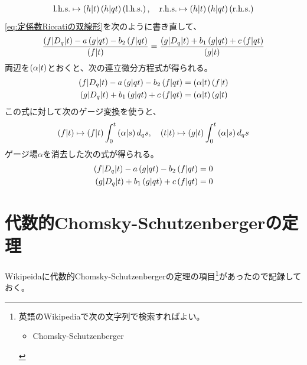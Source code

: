 {\begin{equation*}
\begin{split}
		\text{l.h.s.} \mapsto \plr{h|t}\plr{h|qt}\plr{\text{l.h.s.}}
		,\quad \text{r.h.s.} \mapsto \plr{h|t}\plr{h|qt} \plr{\text{r.h.s.}}
	\end{split}\end{equation*}
	\eqref{eq:定係数Riccatiの双線形}を次のように書き直して、
	\begin{equation*}\begin{split}
		\frac{\plr{f|D_q|t} - a\plr{g|qt} - b_2\plr{f|qt}}{\plr{f|t}}
		= \frac{\plr{g|D_q|t}+ b_1\plr{g|qt} + c\plr{f|qt}} {\plr{g|t}}
	\end{split}\end{equation*}
	両辺を$\plr{\alpha|t}$とおくと、次の連立微分方程式が得られる。
	\begin{equation*}\begin{split}
		\plr{f|D_q|t} - a\plr{g|qt} - b_2\plr{f|qt} 
		&= \plr{\alpha|t}\plr{f|t} \\
		\plr{g|D_q|t} + b_1\plr{g|qt} + c\plr{f|qt} &= \plr{\alpha|t}\plr{g|t}
	\end{split}\end{equation*}
	この式に対して次のゲージ変換を使うと、
	\begin{equation*}\begin{split}
		\plr{f|t}\mapsto \plr{f|t}\int_0^t\plr{\alpha|s}d_qs
		,\quad \plr{t|t}\mapsto \plr{g|t}\int_0^t\plr{\alpha|s}d_qs
	\end{split}\end{equation*}
	ゲージ場$\alpha$を消去した次の式が得られる。
	\begin{equation*}\begin{split}
		\plr{f|D_q|t} - a\plr{g|qt} - b_2\plr{f|qt} &= 0 \\
		\plr{g|D_q|t} + b_1\plr{g|qt} + c\plr{f|qt} &= 0
	\end{split}\end{equation*}
\section{代数的Chomsky-Schutzenbergerの定理}\label{s1:代数的Chomsky-Schutzenbergerの定理} %
	Wikipeidaに代数的Chomsky-Schutzenbergerの定理の項目\footnote{
		英語のWikipediaで次の文字列で検索すればよい。
		\begin{itemize}\setlength{\itemsep}{-1mm} %
			\item Chomsky-Schutzenberger
		\end{itemize} %
	}があったので記録しておく。

}
